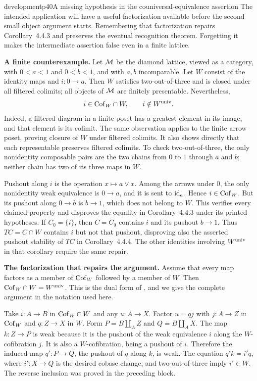 \begin{dcomment}{development}{p40}{A missing hypothesis in the couniversal-equivalence assertion}
The intended application will have a useful factorization available before the second small object argument starts. Remembering that factorization repairs Corollary~4.4.3 and preserves the eventual recognition theorem. Forgetting it makes the intermediate assertion false even in a finite lattice.

\textbf{A finite counterexample.}\ours
Let $\mathcal{M}$ be the diamond lattice, viewed as a category, with $0<a<1$ and $0<b<1$, and with $a,b$ incomparable. Let $W$ consist of the identity maps and $i:0\to a$. Then $W$ satisfies two-out-of-three and is closed under all filtered colimits; all objects of $\mathcal{M}$ are finitely presentable. Nevertheless,
\[
i\in\mathrm{Cof}_W\cap W,\qquad i\notin W^{\mathrm{univ}}.
\]
Indeed, a filtered diagram in a finite poset has a greatest element in its image, and that element is its colimit. The same observation applies to the finite arrow poset, proving closure of $W$ under filtered colimits. It also shows directly that each representable preserves filtered colimits. To check two-out-of-three, the only nonidentity composable pairs are the two chains from $0$ to $1$ through $a$ and $b$; neither chain has two of its three maps in $W$.

Pushout along $i$ is the operation $x\mapsto a\vee x$. Among the arrows under $0$, the only nonidentity weak equivalence is $0\to a$, and it is sent to $\mathrm{id}_a$. Hence $i\in\mathrm{Cof}_W$. But its pushout along $0\to b$ is $b\to1$, which does not belong to $W$. This verifies every claimed property and disproves the equality in Corollary~4.4.3 under its printed hypotheses. If $C_0=\{i\}$, then $C=\widetilde{C_0}$ contains $i$ and its pushout $b\to1$. Thus $TC=C\cap W$ contains $i$ but not that pushout, disproving also the asserted pushout stability of $TC$ in Corollary~4.4.4. The other identities involving $W^{\mathrm{univ}}$ in that corollary require the same repair.

\textbf{The factorization that repairs the argument.}
Assume that every map factors as a member of $\mathrm{Cof}_W$ followed by a member of $W$. Then $\mathrm{Cof}_W\cap W=W^{\mathrm{univ}}$. This is the dual form of \citet[Chapter~XIII, Proposition~4, ms.~pp.~10--11]{GrothendieckDerivateursXIII}, and we give the complete argument in the notation used here.

Take $i:A\to B$ in $\mathrm{Cof}_W\cap W$ and any $u:A\to X$. Factor $u=qj$ with $j:A\to Z$ in $\mathrm{Cof}_W$ and $q:Z\to X$ in $W$. Form $P=B\amalg_A Z$ and $Q=B\amalg_A X$. The map $k:Z\to P$ is weak because it is the pushout of the weak equivalence $i$ along the $W$-cofibration $j$. It is also a $W$-cofibration, being a pushout of $i$. Therefore the induced map $q':P\to Q$, the pushout of $q$ along $k$, is weak. The equation $q'k=i'q$, where $i':X\to Q$ is the desired cobase change, and two-out-of-three imply $i'\in W$. The reverse inclusion was proved in the preceding block.


\end{dcomment}
